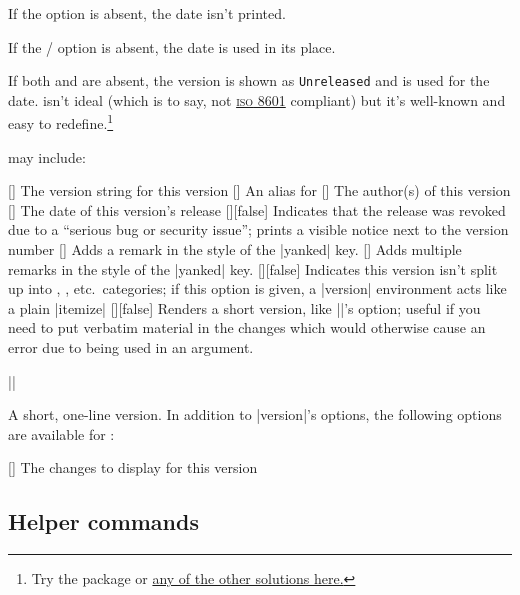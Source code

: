 \documentclass{ltxguidex}
\begin{document}
If the  option is absent, the date isn't printed.

If the / option is absent, the date is used in its
place.

If both  and  are absent, the version is shown
as \texttt{Unreleased} and  is used for the date.  isn't
ideal (which is to say, not
\href{https://en.wikipedia.org/wiki/ISO_8601}{\textsc{iso} 8601} compliant)
but it's well-known and easy to redefine.\footnote{Try the 
package or
\href{https://tex.stackexchange.com/questions/152392/date-format-yyyy-mm-dd}{any
of the other solutions here.}}

 may include:

\begin{keys}
	[]
		The version string for this version
	[]
		An alias for 
	[]
		The author(s) of this version
	[]
		The date of this version's release
	[\bool][false]
		Indicates that the release was revoked due to a ``serious bug or
		security issue''; prints a visible notice next to the version number
	[]
		Adds a remark in the style of the |yanked| key.
	[]
		Adds multiple remarks in the style of the |yanked| key.
	[\bool][false]
		Indicates this version isn't split up into , ,
		etc.\ categories; if this option is given, a |version| environment acts
		like a plain |itemize|
	[\bool][false]
		Renders a short version, like |\shortversion|'s  option;
		useful if you need to put verbatim material in the changes which would
		otherwise cause an error due to being used in an argument.
\end{keys}

\begin{desc}
||
\end{desc}
A short, one-line version. In addition to |version|'s options, the following
options are available for :

\begin{keys}
	[] The changes to display for this version
\end{keys}

\subsection{Helper commands}
\end{document}
